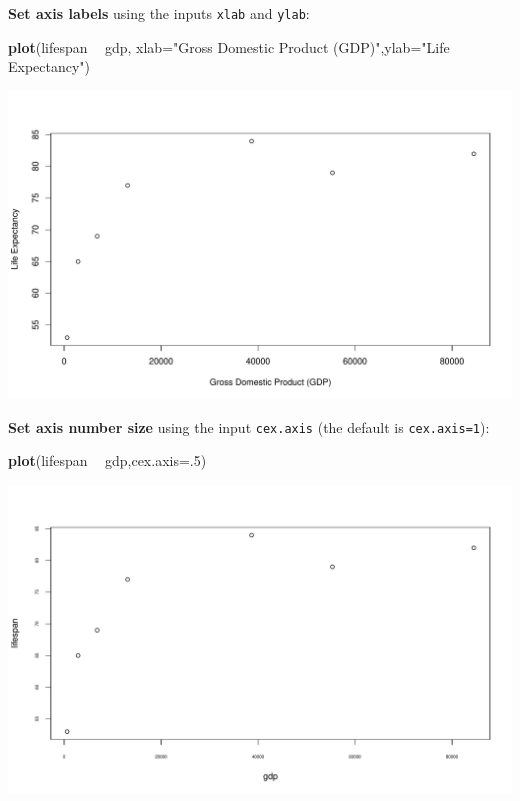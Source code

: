 \documentclass[
]{book}
\newenvironment{Shaded}{\begin{snugshade}}{\end{snugshade}}
\newcommand{\DataTypeTok}[1]{\textcolor[rgb]{0.13,0.29,0.53}{#1}}
\newcommand{\DecValTok}[1]{\textcolor[rgb]{0.00,0.00,0.81}{#1}}
\newcommand{\KeywordTok}[1]{\textcolor[rgb]{0.13,0.29,0.53}{\textbf{#1}}}
\newcommand{\NormalTok}[1]{#1}
\newcommand{\OperatorTok}[1]{\textcolor[rgb]{0.81,0.36,0.00}{\textbf{#1}}}
\newcommand{\StringTok}[1]{\textcolor[rgb]{0.31,0.60,0.02}{#1}}
\begin{document}
\textbf{Set axis labels} using the inputs \texttt{xlab} and \texttt{ylab}:

\begin{Shaded}
\begin{Highlighting}[]
\KeywordTok{plot}\NormalTok{(lifespan }\OperatorTok{~}\StringTok{ }\NormalTok{gdp, }\DataTypeTok{xlab=}\StringTok{"Gross Domestic Product (GDP)"}\NormalTok{,}\DataTypeTok{ylab=}\StringTok{"Life Expectancy"}\NormalTok{)}
\end{Highlighting}
\end{Shaded}

\includegraphics{figures/unnamed-chunk-92-1.pdf}

\textbf{Set axis number size} using the input \texttt{cex.axis} (the default is \texttt{cex.axis=1}):

\begin{Shaded}
\begin{Highlighting}[]
\KeywordTok{plot}\NormalTok{(lifespan }\OperatorTok{~}\StringTok{ }\NormalTok{gdp,}\DataTypeTok{cex.axis=}\NormalTok{.}\DecValTok{5}\NormalTok{)}
\end{Highlighting}
\end{Shaded}

\includegraphics{figures/unnamed-chunk-93-1.pdf}
\end{document}
